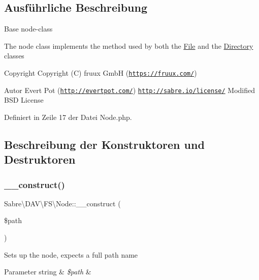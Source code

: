 \subsection{Ausführliche Beschreibung}
Base node-\/class

The node class implements the method used by both the \mbox{\hyperlink{class_sabre_1_1_d_a_v_1_1_f_s_1_1_file}{File}} and the \mbox{\hyperlink{class_sabre_1_1_d_a_v_1_1_f_s_1_1_directory}{Directory}} classes

\begin{DoxyCopyright}{Copyright}
Copyright (C) fruux GmbH (\href{https://fruux.com/}{\tt https\+://fruux.\+com/}) 
\end{DoxyCopyright}
\begin{DoxyAuthor}{Autor}
Evert Pot (\href{http://evertpot.com/}{\tt http\+://evertpot.\+com/})  \href{http://sabre.io/license/}{\tt http\+://sabre.\+io/license/} Modified B\+SD License 
\end{DoxyAuthor}


Definiert in Zeile 17 der Datei Node.\+php.



\subsection{Beschreibung der Konstruktoren und Destruktoren}
\mbox{\label{class_sabre_1_1_d_a_v_1_1_f_s_1_1_node_ab1c055be79cb4d73713bbe9f4c601c01}} 
\subsubsection{\texorpdfstring{\+\_\+\+\_\+construct()}{\_\_construct()}}
{\footnotesize\ttfamily Sabre\textbackslash{}\+D\+A\+V\textbackslash{}\+F\+S\textbackslash{}\+Node\+::\+\_\+\+\_\+construct (\begin{DoxyParamCaption}\item[{}]{\$path }\end{DoxyParamCaption})}

Sets up the node, expects a full path name


\begin{DoxyParams}[1]{Parameter}
string & {\em \$path} & \\
\hline
\end{DoxyParams}


